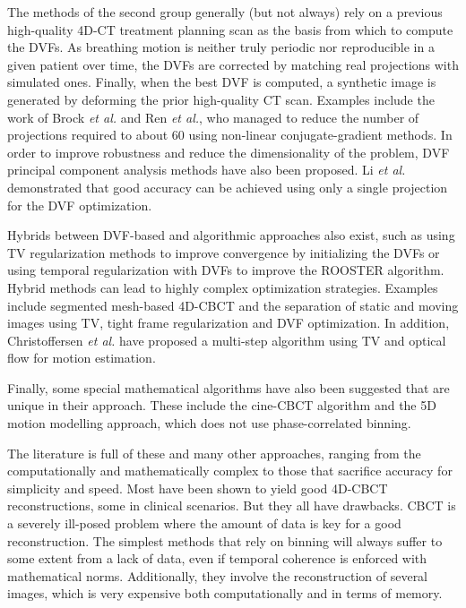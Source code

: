 The methods of the second group generally (but not always) rely on a previous high-quality 4D-CT treatment planning scan as the basis from which to compute the DVFs.  As breathing motion is neither truly periodic nor reproducible in a given patient over time, the DVFs are corrected by matching real projections with simulated ones.  Finally, when the best DVF is computed, a synthetic image is generated by deforming the prior high-quality CT scan.  Examples include the work of Brock \textit{et al.}\cite{brock2010} and Ren \textit{et al.}\cite{Ren20121584}, who managed to reduce the number of projections required to about 60 using non-linear conjugate-gradient methods.  In order to improve robustness and reduce the dimensionality of the problem, DVF principal component analysis methods have also been proposed\cite{zhang2010correction}.  Li \textit{et al.}\cite{:/content/aapm/journal/medphys/37/6/10.1118/1.3426002}\cite{:/content/aapm/journal/medphys/38/5/10.1118/1.3582693} demonstrated that good accuracy can be achieved using only a single projection for the DVF optimization.

Hybrids between DVF-based and algorithmic approaches also exist, such as using TV regularization methods to improve convergence by initializing the DVFs\cite{wang2012high} or using temporal regularization with DVFs to improve the ROOSTER algorithm\cite{mory2016motion}.  Hybrid methods can lead to highly complex optimization strategies.  Examples include segmented mesh-based 4D-CBCT\cite{0031-9155-61-3-996} and the separation of static and moving images using TV, tight frame regularization and DVF optimization\cite{0031-9155-56-11-002}.  In addition, Christoffersen \textit{et al.}\cite{christoffersen2013registration} have proposed a multi-step algorithm using TV and optical flow for motion estimation.

Finally, some special mathematical algorithms have also been suggested that are unique in their approach.  These include the cine-CBCT algorithm\cite{6803058} and the 5D motion modelling approach\cite{0266-5611-31-11-115007}, which does not use phase-correlated binning.

The literature is full of these and many other approaches, ranging from the computationally and mathematically complex to those that sacrifice accuracy for simplicity and speed.  Most have been shown to yield good 4D-CBCT reconstructions, some in clinical scenarios.  But they all have drawbacks.  CBCT is a severely ill-posed problem where the amount of data is key for a good reconstruction.  The simplest methods that rely on binning will always suffer to some extent from a lack of data, even if temporal coherence is enforced with mathematical norms.  Additionally, they involve the reconstruction of several images, which is very expensive both computationally and in terms of memory.

